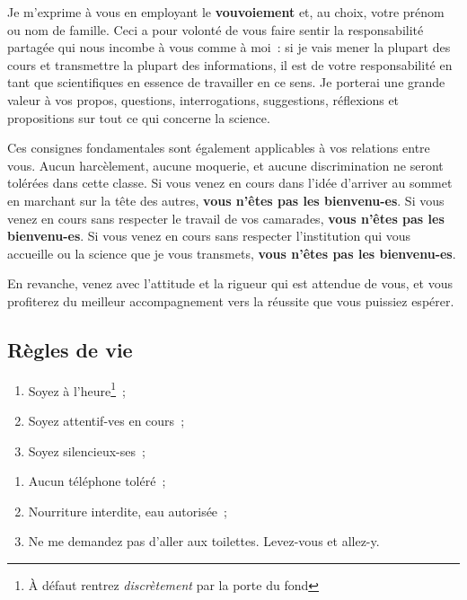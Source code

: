 \documentclass[a4paper, 10pt, garamond]{book}
\begin{document}
Je m'exprime à vous en employant le \textbf{vouvoiement} et, au choix,
votre prénom ou nom de famille. Ceci a pour volonté de vous faire sentir la
responsabilité partagée qui nous incombe à vous comme à moi~: si je vais mener
la plupart des cours et transmettre la plupart des informations, il est de votre
responsabilité en tant que scientifiques en essence de travailler en ce sens. Je
porterai une grande valeur à vos propos, questions, interrogations, suggestions,
réflexions et propositions sur tout ce qui concerne la science.

Ces consignes fondamentales sont également applicables à vos relations entre
vous. Aucun harcèlement, aucune moquerie, et aucune discrimination ne seront
tolérées dans cette classe. Si vous venez en cours dans l'idée d'arriver au
sommet en marchant sur la tête des autres, \textbf{vous n'êtes pas les
	bienvenu-es}. Si vous venez en cours sans respecter le travail de vos camarades,
\textbf{vous n'êtes pas les bienvenu-es}. Si vous venez en cours sans respecter
l'institution qui vous accueille ou la science que je vous transmets,
\textbf{vous n'êtes pas les bienvenu-es}.

En revanche, venez avec l'attitude et la rigueur qui est attendue de vous, et
vous profiterez du meilleur accompagnement vers la réussite que vous puissiez
espérer.

\subsection{Règles de vie}
\noindent
\begin{minipage}[t]{.48\linewidth}
	\begin{enumerate}
		\item Soyez à l'heure\footnote{À défaut rentrez \textit{discrètement} par la
			      porte du fond}~;
		\item Soyez attentif-ves en cours~;
		\item Soyez silencieux-ses~;
	\end{enumerate}
\end{minipage}
\hfill
\begin{minipage}[t]{.48\linewidth}
	\begin{enumerate}[resume]
		\item Aucun téléphone toléré~;
		\item Nourriture interdite, eau autorisée~;
		\item Ne me demandez pas d'aller aux toilettes. Levez-vous et allez-y.
	\end{enumerate}
\end{minipage}
\end{document}
